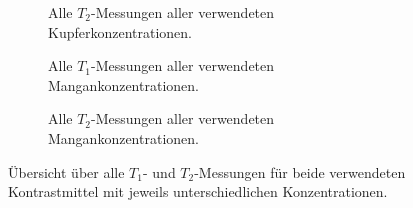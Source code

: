 \begin{figure}[H]
    \begin{subfigure}[b]{0.5\textwidth}
        \centering
        \resizebox{1\textwidth}{!}{}
        \caption{Alle $T_2$-Messungen aller verwendeten Kupferkonzentrationen.}
        \label{fig:T2CU}
    \end{subfigure}
    \begin{subfigure}[b]{0.5\textwidth}
        \centering
        \resizebox{1\textwidth}{!}{}
        \caption{Alle $T_1$-Messungen aller verwendeten Mangankonzentrationen.}
        \label{fig:T1Mn}
    \end{subfigure}
    \begin{subfigure}[b]{1\textwidth}
        \centering
        \resizebox{0.5\textwidth}{!}{}
        \caption{Alle $T_2$-Messungen aller verwendeten Mangankonzentrationen.}
        \label{fig:T2M}
    \end{subfigure}
    \caption{Übersicht über alle $T_1$- und $T_2$-Messungen für beide verwendeten Kontrastmittel mit jeweils unterschiedlichen Konzentrationen.}
    \label{fig:RelaxZeitAlle}
\end{figure}
